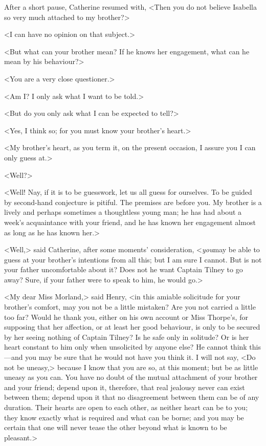  After a short pause, Catherine resumed with, <Then you do not believe Isabella so very much attached to my brother?> 

 <I can have no opinion on that subject.> 

 <But what can your brother mean? If he knows her engagement, what can he mean by his behaviour?> 

 <You are a very close questioner.> 

 <Am I? I only ask what I want to be told.> 

 <But do you only ask what I can be expected to tell?> 

 <Yes, I think so; for you must know your brother's heart.> 

 <My brother's heart, as you term it, on the present occasion, I assure you I can only guess at.> 

 <Well?> 

 <Well! Nay, if it is to be guesswork, let us all guess for ourselves. To be guided by second-hand conjecture is pitiful. The premises are before you. My brother is a lively and perhaps sometimes a thoughtless young man; he has had about a week's acquaintance with your friend, and he has known her engagement almost as long as he has known her.> 

 <Well,> said Catherine, after some moments' consideration, <\textit{you}may be able to guess at your brother's intentions from all this; but I am sure I cannot. But is not your father uncomfortable about it? Does not he want Captain Tilney to go away? Sure, if your father were to speak to him, he would go.> 

 <My dear Miss Morland,> said Henry, <in this amiable solicitude for your brother's comfort, may you not be a little mistaken? Are you not carried a little too far? Would he thank you, either on his own account or Miss Thorpe's, for supposing that her affection, or at least her good behaviour, is only to be secured by her seeing nothing of Captain Tilney? Is he safe only in solitude? Or is her heart constant to him only when unsolicited by anyone else? He cannot think this—and you may be sure that he would not have you think it. I will not say, <Do not be uneasy,> because I know that you are so, at this moment; but be as little uneasy as you can. You have no doubt of the mutual attachment of your brother and your friend; depend upon it, therefore, that real jealousy never can exist between them; depend upon it that no disagreement between them can be of any duration. Their hearts are open to each other, as neither heart can be to you; they know exactly what is required and what can be borne; and you may be certain that one will never tease the other beyond what is known to be pleasant.> 

